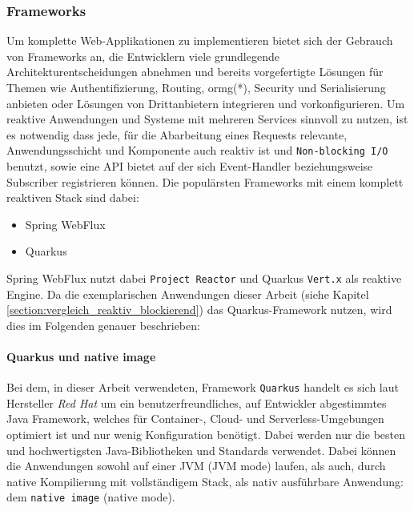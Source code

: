\subsubsection{Frameworks}
\label{subsubsec:frameworks}
Um komplette Web-Applikationen zu implementieren bietet sich der Gebrauch von Frameworks an, die Entwicklern viele grundlegende Architekturentscheidungen
abnehmen und bereits vorgefertigte Lösungen für Themen wie Authentifizierung, Routing, \Gls{ormg}(*), Security und Serialisierung anbieten oder
Lösungen von Drittanbietern integrieren und vorkonfigurieren.
Um reaktive Anwendungen und Systeme mit mehreren Services sinnvoll zu nutzen, ist es notwendig dass jede, für die Abarbeitung eines Requests relevante,
Anwendungsschicht und Komponente auch reaktiv ist und \verb|Non-blocking I/O| benutzt, sowie eine API bietet auf der
sich Event-Handler beziehungsweise Subscriber registrieren können.\newline
Die populärsten Frameworks mit einem komplett reaktiven Stack sind dabei:

\begin{itemize}
  \item Spring WebFlux
  \item Quarkus
\end{itemize}

Spring WebFlux nutzt dabei \verb|Project Reactor| und Quarkus \verb|Vert.x| als reaktive Engine. \parencite{QuarkusReactiveGettingStarted}
Da die exemplarischen Anwendungen dieser Arbeit (siehe Kapitel \ref{section:vergleich_reaktiv_blockierend}) das Quarkus-Framework nutzen, wird dies
im Folgenden genauer beschrieben:
\paragraph{Quarkus und native image}

Bei dem, in dieser Arbeit verwendeten, Framework \verb|Quarkus| handelt es sich laut Hersteller \textit{Red Hat} um ein
benutzerfreundliches, auf Entwickler abgestimmtes Java Framework, welches für Container-, Cloud- und Serverless-Umgebungen optimiert ist und nur wenig
Konfiguration benötigt. Dabei werden nur die besten und hochwertigsten Java-Bibliotheken und Standards verwendet.
Dabei können die Anwendungen sowohl auf einer JVM (JVM mode) laufen, als auch, durch native Kompilierung mit vollständigem Stack,
als nativ ausführbare Anwendung: dem \verb|native image| (native mode).

